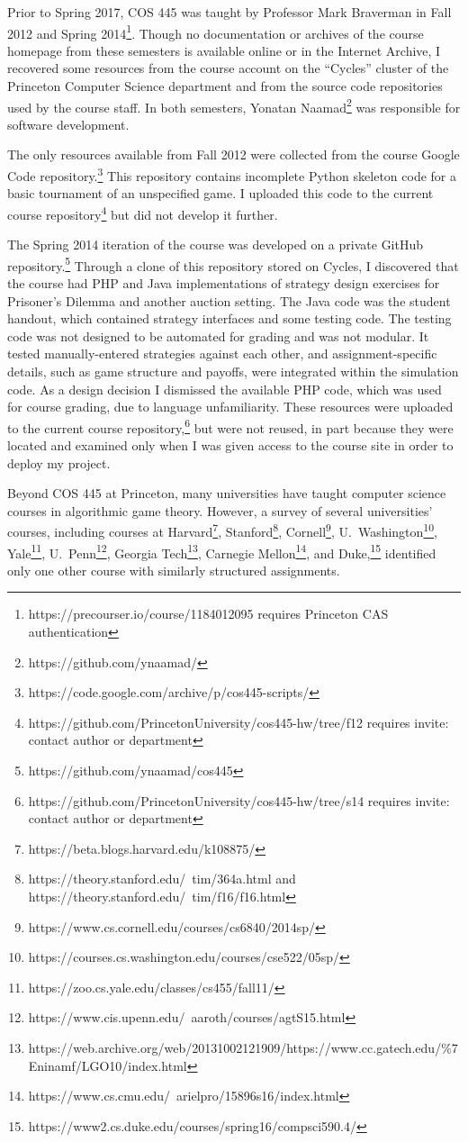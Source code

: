 \documentclass[pageno]{jpaper}
\begin{document}
Prior to Spring 2017, COS 445 was taught by Professor Mark Braverman in Fall 2012 and Spring 2014\footnote{https://precourser.io/course/1184012095 requires Princeton CAS authentication}.
Though no documentation or archives of the course homepage from these semesters is available online or in the Internet Archive, I recovered some resources from the course account on the ``Cycles'' cluster of the Princeton Computer Science department and from the source code repositories used by the course staff.
In both semesters, Yonatan Naamad\footnote{https://github.com/ynaamad/} was responsible for software development.

The only resources available from Fall 2012 were collected from the course Google Code repository.\footnote{https://code.google.com/archive/p/cos445-scripts/}
This repository contains incomplete Python skeleton code for a basic tournament of an unspecified game.
I uploaded this code to the current course repository\footnote{https://github.com/PrincetonUniversity/cos445-hw/tree/f12 requires invite: contact author or department} but did not develop it further.

The Spring 2014 iteration of the course was developed on a private GitHub repository.\footnote{https://github.com/ynaamad/cos445}
Through a clone of this repository stored on Cycles, I discovered that the course had PHP and Java implementations of strategy design exercises for Prisoner's Dilemma and another auction setting.
The Java code was the student handout, which contained strategy interfaces and some testing code.
The testing code was not designed to be automated for grading and was not modular.
It tested manually-entered strategies against each other, and assignment-specific details, such as game structure and payoffs, were integrated within the simulation code.
As a design decision I dismissed the available PHP code, which was used for course grading, due to language unfamiliarity.
These resources were uploaded to the current course repository,\footnote{https://github.com/PrincetonUniversity/cos445-hw/tree/s14 requires invite: contact author or department} but were not reused, in part because they were located and examined only when I was given access to the course site in order to deploy my project.

Beyond COS 445 at Princeton, many universities have taught computer science courses in algorithmic game theory.
However, a survey of several universities' courses, including courses at Harvard\footnote{https://beta.blogs.harvard.edu/k108875/}, Stanford\footnote{https://theory.stanford.edu/~tim/364a.html and https://theory.stanford.edu/~tim/f16/f16.html}, Cornell\footnote{https://www.cs.cornell.edu/courses/cs6840/2014sp/}, U.\ Washington\footnote{https://courses.cs.washington.edu/courses/cse522/05sp/}, Yale\footnote{https://zoo.cs.yale.edu/classes/cs455/fall11/}, U.\ Penn\footnote{https://www.cis.upenn.edu/~aaroth/courses/agtS15.html}, Georgia Tech\footnote{https://web.archive.org/web/20131002121909/https://www.cc.gatech.edu/\%7Eninamf/LGO10/index.html}, Carnegie Mellon\footnote{https://www.cs.cmu.edu/~arielpro/15896s16/index.html}, and Duke,\footnote{https://www2.cs.duke.edu/courses/spring16/compsci590.4/} identified only one other course with similarly structured assignments.
\end{document}

